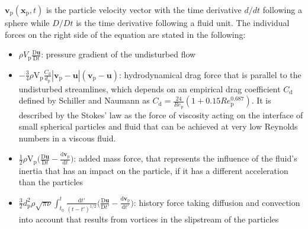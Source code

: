 \documentclass[11pt,a4paper,openany,oneside,parskip=half*]{article}
\renewcommand*\vec[1]{\boldsymbol{#1}}
\begin{document}
$\vec{v}_\mathrm{p}(\vec{x}_\mathrm{p},t)$ is the particle velocity vector with the time derivative $d/dt$ following a sphere while $D/Dt$  is the time derivative following a fluid unit. 
The individual forces on the right side of the equation are stated in the following:
\newline
\begin{itemize} 
\item  $\rho V_\mathrm{p}\frac{\mathrm{D}\vec{u}}{\mathrm{D}t}$: \newline
pressure gradient of the undisturbed flow
\item  $-\frac{3}{4}\rho \mathrm{V}_\mathrm{p} \frac{C_\mathrm{d}}{d_\mathrm{p}}|\vec{v}_\mathrm{p}-    \vec{u}|(\vec{v}_\mathrm{p}-\vec{u})$:\newline
hydrodynamical drag force that is parallel to the undisturbed streamlines, which depends on an empirical drag coefficient $C_{\mathrm{d}}$ defined by Schiller and Naumann as
$C_\mathrm{d} = \frac{24}{Re_\mathrm{p}}(1+0.15Re_\mathrm{p}^\mathrm{0.687})$.
It is described by the Stokes' law as the force of viscosity acting on the interface of small spherical particles and fluid that can be achieved at very low Reynolds numbers in a viscous fluid.

\item $\frac{1}{2}\rho \mathrm{V}_\mathrm{p} \biggl(\frac{\mathrm{D}\vec{u}}{\mathrm{D}t}-\frac{\mathrm{d}\vec{v}_\mathrm{p}}{\mathrm{d}t}\biggl)$:\newline
added mass force, that represents the influence of the fluid's inertia that has an impact on the particle, if it has a different acceleration than the particles
\item $\frac{3}{2}d_\mathrm{p}^\mathrm{2}\rho\sqrt{\pi\nu}\int_{t_\mathrm{0}}^{t} \frac{\mathrm{d}t'}{(t-t')^\mathrm{1/2}} \biggl(\frac{\mathrm{D}\vec{u}}{\mathrm{D}t'}- \frac{\mathrm{d}\vec{v}_\mathrm{p}}{\mathrm{d}t'}\biggl) $: \newline
history force taking diffusion and convection into account that results from vortices in the slipstream of the particles
\end{itemize}
\end{document}
